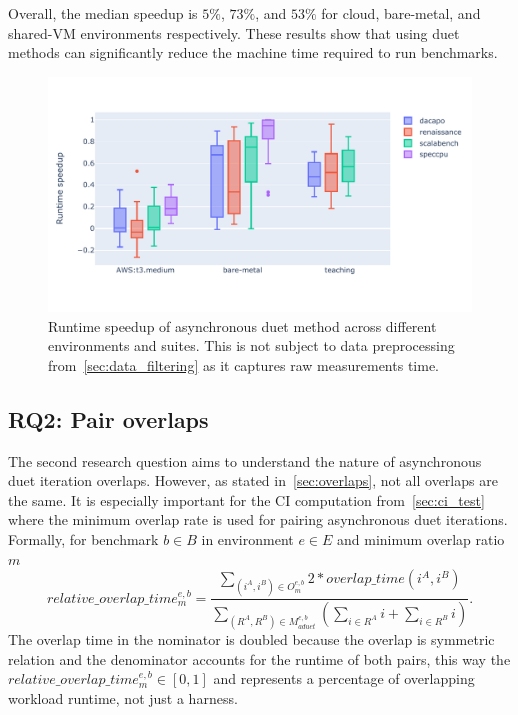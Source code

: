 Overall, the median speedup is $5\%$, $73\%$, and $53\%$ for cloud, bare-metal, and shared-VM environments respectively.
These results show that using duet methods can significantly reduce the machine time required to run benchmarks.

\begin{figure}
	\centering
	\includegraphics[width=.9\linewidth]{./figures/runtime_speedup.pdf}
	\caption{
		Runtime speedup of asynchronous duet method across different environments and suites.
		This is not subject to data preprocessing from~\cref{sec:data_filtering} as it captures raw measurements time.
	}
	\label{fig:runtime_speedup}
\end{figure}

\subsection{RQ2: Pair overlaps}
\label{sec:rq2}

The second research question aims to understand the nature of asynchronous duet iteration overlaps.
However, as stated in~\cref{sec:overlaps}, not all overlaps are the same.
It is especially important for the CI computation from~\ref{sec:ci_test} where the minimum overlap rate is used for pairing asynchronous duet iterations.
Formally, for benchmark $b \in B$ in environment $e \in E$ and minimum overlap ratio $m$
$$
relative\_overlap\_time^{e, b}_m = \frac{\sum\limits_{(i^A, i^B) \in O^{e,b}_m} 2 * overlap\_time(i^A, i^B)}{\sum\limits_{(R^A, R^B) \in M^{e, b}_{aduet}}(\sum\limits_{i \in R^A} i + \sum\limits_{i \in R^B} i)}.
$$
The overlap time in the nominator is doubled because the overlap is symmetric relation and the denominator accounts for the runtime of both pairs, this way the $relative\_overlap\_time^{e, b}_m \in [0, 1]$ and represents a percentage of overlapping workload runtime, not just a harness.

